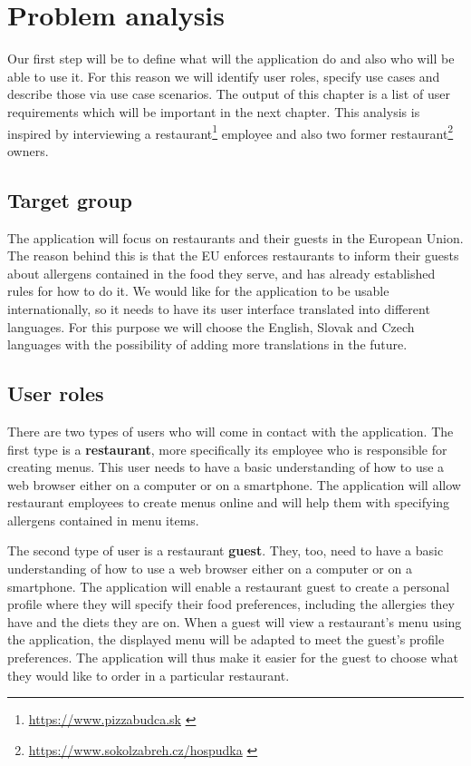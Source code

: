 \chapter{Problem analysis}
Our first step will be to define what will the application do and also who will be able to use it.
For this reason we will identify user roles, specify use cases and describe those via use case scenarios.
The output of this chapter is a list of user requirements which will be important in the next chapter.
This analysis is inspired by interviewing a restaurant\footnote{\url{https://www.pizzabudca.sk}  \label{fnlabel}} employee and also two former restaurant\footnote{\url{https://www.sokolzabreh.cz/hospudka}  \label{fnlabel}} owners.

\section{Target group}
The application will focus on restaurants and their guests in the European Union.
The reason behind this is that the EU enforces restaurants to inform their guests about allergens contained in the food they serve, and has already established rules for how to do it.
We would like for the application to be usable internationally, so it needs to have its user interface translated into different languages.
For this purpose we will choose the English, Slovak and Czech languages with the possibility of adding more translations in the future.

\section{User roles}
There are two types of users who will come in contact with the application.
The first type is a \textbf{restaurant}, more specifically its employee who is responsible for creating menus.
This user needs to have a basic understanding of how to use a web browser either on a computer or on a smartphone.
The application will allow restaurant employees to create menus online and will help them with specifying allergens contained in menu items.

The second type of user is a restaurant \textbf{guest}.
They, too, need to have a basic understanding of how to use a web browser either on a computer or on a smartphone.
The application will enable a restaurant guest to create a personal profile where they will specify their food preferences, including the allergies they have and the diets they are on.
When a guest will view a restaurant's menu using the application, the displayed menu will be adapted to meet the guest's profile preferences.
The application will thus make it easier for the guest to choose what they would like to order in a particular restaurant.

